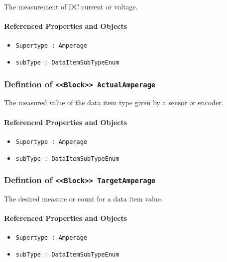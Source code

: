 The measurement of DC current or voltage.

\FloatBarrier
\paragraph{Referenced Properties and Objects}

\begin{itemize}
\item \texttt{Supertype : Amperage}

\item \texttt{subType : DataItemSubTypeEnum}

\end{itemize}
\FloatBarrier
\subsubsection{Defintion of \texttt{<<Block>> ActualAmperage}}
  \label{type:ActualAmperage}

\FloatBarrier

The measured value of the data item type given by a sensor or encoder.

\FloatBarrier
\paragraph{Referenced Properties and Objects}

\begin{itemize}
\item \texttt{Supertype : Amperage}

\item \texttt{subType : DataItemSubTypeEnum}

\end{itemize}
\FloatBarrier
\subsubsection{Defintion of \texttt{<<Block>> TargetAmperage}}
  \label{type:TargetAmperage}

\FloatBarrier

The desired measure or count for a data item value.

\FloatBarrier
\paragraph{Referenced Properties and Objects}

\begin{itemize}
\item \texttt{Supertype : Amperage}

\item \texttt{subType : DataItemSubTypeEnum}

\end{itemize}
\FloatBarrier
